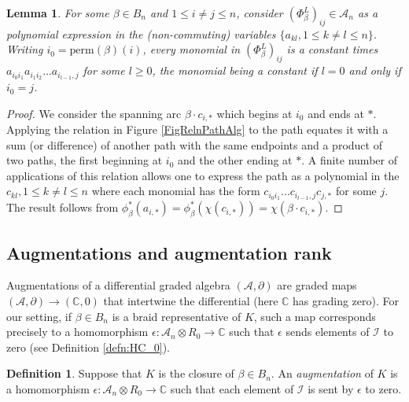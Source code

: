 \documentclass[11pt]{amsart}
\def\C{{\mathbb C}}
\def\A{{\mathcal A}}
\def\s{{\sigma}}
\newtheorem{lem}[thm]{Lemma}
\theoremstyle{definition}
\newtheorem{defn}[thm]{Definition}
\begin{document}
  \begin{lem} For some $\beta\in B_n$ and $1\le i\ne j\le n$, consider $(\Phi_\beta^L)_{ij}\in \A_n$ as a polynomial expression in the (non-commuting) variables $\{a_{kl}, 1\le k\ne l\le n\}$. Writing $i_0=\text{perm}(\beta)(i)$, every monomial in $(\Phi_\beta^L)_{ij}$ is a constant times $a_{i_0i_1}a_{i_1i_2}\ldots a_{i_{l-1},j}$ for some $l\ge 0$, the monomial being a constant if $l=0$ and only if $i_0=j$.
  \label{lem:monomial}
  \end{lem}
  \begin{proof}We consider the spanning arc $\beta\cdot c_{i,\ast}$ which begins at $i_0$ and ends at $\ast$. Applying the relation in Figure \ref{FigRelnPathAlg} to the path equates it with a sum (or difference) of another path with the same endpoints and a product of two paths, the first beginning at $i_0$ and the other ending at $\ast$. A finite number of applications of this relation allows one to express the path as a polynomial in the $c_{kl}, 1\le k\ne l\le n$ where each monomial has the form $c_{i_0i_1}\ldots c_{i_{l-1},j}c_{j,\ast}$ for some $j$. The result follows from $\phi^\ast_\beta(a_{i,\ast}) = \phi^\ast_\beta(\chi(c_{i,\ast})) = \chi(\beta\cdot c_{i,\ast})$.
  \end{proof}

\subsection{Augmentations and augmentation rank}
\label{SecBG_AugRk}

  Augmentations of a differential graded algebra $(\A,\partial)$ are graded maps $(\A,\partial)\to (\C,0)$ that intertwine the differential (here $\C$ has grading zero). For our setting, if $\beta\in B_n$ is a braid representative of $K$, such a map corresponds precisely to a homomorphism $\epsilon:\A_n\otimes R_0\to\C$ such that $\epsilon$ sends elements of $\mathcal I$ to zero (see Definition \ref{defn:HC_0}).

  \begin{defn}
  Suppose that $K$ is the closure of $\beta\in B_n$. An \emph{augmentation} of $K$ is a homomorphism $\epsilon: \A_n\otimes R_0\rightarrow \C$ such that each element of $\mathcal I$ is sent by $\epsilon$ to zero.
  \label{defn:Aug}
  \end{defn}
\end{document}
